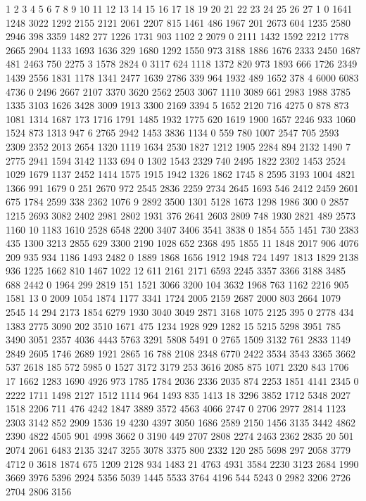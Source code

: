 1	2	3	4	5	6	7	8	9	10	11	12	13	14	15	16	17	18	19	20	21	22	23	24	25	26	27
1	0	1641	1248	3022	1292	2155	2121	2061	2207	815	1461	486	1967	201	2673	604	1235	2580	2946	398	3359	1482	277	1226	1731	903	1102
2	2079	0	2111	1432	1592	2212	1778	2665	2904	1133	1693	1636	329	1680	1292	1550	973	3188	1886	1676	2333	2450	1687	481	2463	750	2275
3	1578	2824	0	3117	624	1118	1372	820	973	1893	666	1726	2349	1439	2556	1831	1178	1341	2477	1639	2786	339	964	1932	489	1652	378
4	6000	6083	4736	0	2496	2667	2107	3370	3620	2562	2503	3067	1110	3089	661	2983	1988	3785	1335	3103	1626	3428	3009	1913	3300	2169	3394
5	1652	2120	716	4275	0	878	873	1081	1314	1687	173	1716	1791	1485	1932	1775	620	1619	1900	1657	2246	933	1060	1524	873	1313	947
6	2765	2942	1453	3836	1134	0	559	780	1007	2547	705	2593	2309	2352	2013	2654	1320	1119	1634	2530	1827	1212	1905	2284	894	2132	1490
7	2775	2941	1594	3142	1133	694	0	1302	1543	2329	740	2495	1822	2302	1453	2524	1029	1679	1137	2452	1414	1575	1915	1942	1326	1862	1745
8	2595	3193	1004	4821	1366	991	1679	0	251	2670	972	2545	2836	2259	2734	2645	1693	546	2412	2459	2601	675	1784	2599	338	2362	1076
9	2892	3500	1301	5128	1673	1298	1986	300	0	2857	1215	2693	3082	2402	2981	2802	1931	376	2641	2603	2809	748	1930	2821	489	2573	1160
10	1183	1610	2528	6548	2200	3407	3406	3541	3838	0	1854	555	1451	730	2383	435	1300	3213	2855	629	3300	2190	1028	652	2368	495	1855
11	1848	2017	906	4076	209	935	934	1186	1493	2482	0	1889	1868	1656	1912	1948	724	1497	1813	1829	2138	936	1225	1662	810	1467	1022
12	611	2161	2171	6593	2245	3357	3366	3188	3485	688	2442	0	1964	299	2819	151	1521	3066	3200	104	3632	1968	763	1162	2216	905	1581
13													0	2009	1054	1874	1177	3341	1724	2005	2159	2687	2000	803	2664	1079	2545
14	294	2173	1854	6279	1930	3040	3049	2871	3168	1075	2125	395		0	2778	434	1383	2775	3090	202	3510	1671	475	1234	1928	929	1282
15	5215	5298	3951	785	3490	3051	2357	4036	4443	5763	3291	5808		5491	0	2765	1509	3132	761	2833	1149	2849	2605	1746	2689	1921	2865
16	788	2108	2348	6770	2422	3534	3543	3365	3662	537	2618	185		572	5985	0	1527	3172	3179	253	3616	2085	875	1071	2320	843	1706
17	1662	1283	1690	4926	973	1785	1784	2036	2336	2035	874	2253		1851	4141	2345	0	2222	1711	1498	2127	1512	1114	964	1493	835	1413
18	3296	3852	1712	5348	2027	1518	2206	711	476	4242	1847	3889		3572	4563	4066	2747	0	2706	2977	2814	1123	2303	3142	852	2909	1536
19	4230	4397	3050	1686	2589	2150	1456	3135	3442	4862	2390	4822		4505	901	4998		3662	0	3190	449	2707	2808	2274	2463	2362	2835
20	501	2074	2061	6483	2135	3247	3255	3078	3375	800	2332	120		285	5698	297	2058	3779	4712	0	3618	1874	675	1209	2128	934	1483
21	4763	4931	3584	2230	3123	2684	1990	3669	3976	5396	2924	5356		5039	1445	5533	3764	4196	544	5243	0	2982	3206	2726	2704	2806	3156
